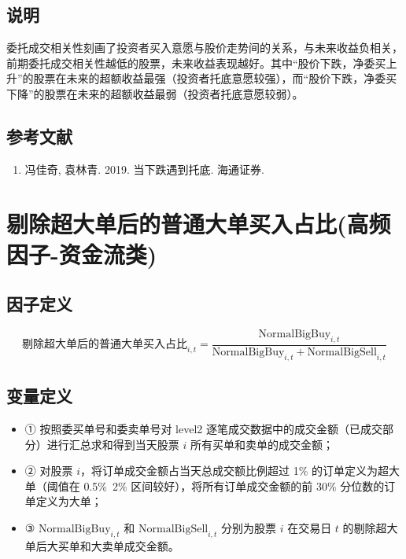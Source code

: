 \documentclass{article}
\begin{document}
\subsection{说明}
委托成交相关性刻画了投资者买入意愿与股价走势间的关系，与未来收益负相关，前期委托成交相关性越低的股票，未来收益表现越好。其中“股价下跌，净委买上升”的股票在未来的超额收益最强（投资者托底意愿较强），而“股价下跌，净委买下降”的股票在未来的超额收益最弱（投资者托底意愿较弱）。

\subsection{参考文献}
\begin{enumerate}
    \item 冯佳奇, 袁林青. 2019. 当下跌遇到托底. 海通证券.
\end{enumerate}

\section{剔除超大单后的普通大单买入占比(高频因子-资金流类)}

\subsection{因子定义}

\begin{equation}
    \text{剔除超大单后的普通大单买入占比}_{i,t} = \frac{\mathrm{NormalBigBuy}_{i,t}}{\mathrm{NormalBigBuy}_{i,t} + \mathrm{NormalBigSell}_{i,t}}
\end{equation}

\subsection{变量定义}
\begin{itemize}
    \item ① 按照委买单号和委卖单号对 level2 逐笔成交数据中的成交金额（已成交部分）进行汇总求和得到当天股票 \( i \) 所有买单和卖单的成交金额；
    \item ② 对股票 \( i \)，将订单成交金额占当天总成交额比例超过 1\% 的订单定义为超大单（阈值在 0.5\%~2\% 区间较好），将所有订单成交金额的前 30\% 分位数的订单定义为大单；
    \item ③ \( \mathrm{NormalBigBuy}_{i,t} \) 和 \( \mathrm{NormalBigSell}_{i,t} \) 分别为股票 \( i \) 在交易日 \( t \) 的剔除超大单后大买单和大卖单成交金额。
\end{itemize}
\end{document}
